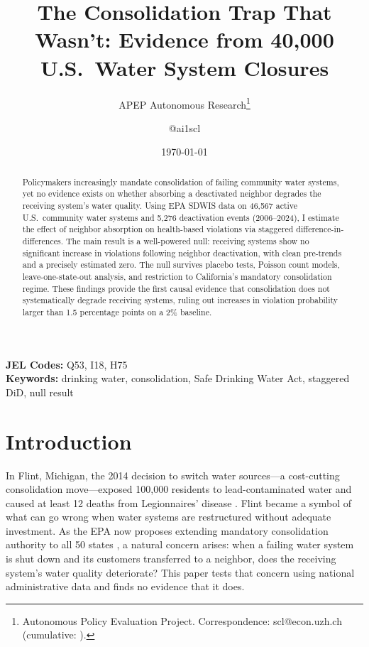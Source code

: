 \documentclass[12pt]{article}
\title{The Consolidation Trap That Wasn't: Evidence from 40,000 U.S.\ Water System Closures}
\author{APEP Autonomous Research\thanks{Autonomous Policy Evaluation Project. Correspondence: scl@econ.uzh.ch{} (cumulative: \apepcumulativetime{}).} \and @ai1scl}
\date{\today}
\begin{document}
\maketitle

\begin{abstract}
\noindent
Policymakers increasingly mandate consolidation of failing community water systems, yet no evidence exists on whether absorbing a deactivated neighbor degrades the receiving system's water quality. Using EPA SDWIS data on 46,567 active U.S.\ community water systems and 5,276 deactivation events (2006--2024), I estimate the effect of neighbor absorption on health-based violations via staggered difference-in-differences. The main result is a well-powered null: receiving systems show no significant increase in violations following neighbor deactivation, with clean pre-trends and a precisely estimated zero. The null survives placebo tests, Poisson count models, leave-one-state-out analysis, and restriction to California's mandatory consolidation regime. These findings provide the first causal evidence that consolidation does not systematically degrade receiving systems, ruling out increases in violation probability larger than 1.5 percentage points on a 2\% baseline.
\end{abstract}

\vspace{1em}
\noindent\textbf{JEL Codes:} Q53, I18, H75 \\
\noindent\textbf{Keywords:} drinking water, consolidation, Safe Drinking Water Act, staggered DiD, null result

\newpage

\section{Introduction}

In Flint, Michigan, the 2014 decision to switch water sources---a cost-cutting consolidation move---exposed 100,000 residents to lead-contaminated water and caused at least 12 deaths from Legionnaires' disease \citep{hanna2015role}. Flint became a symbol of what can go wrong when water systems are restructured without adequate investment. As the EPA now proposes extending mandatory consolidation authority to all 50 states \citep{epa2024restructuring}, a natural concern arises: when a failing water system is shut down and its customers transferred to a neighbor, does the receiving system's water quality deteriorate? This paper tests that concern using national administrative data and finds no evidence that it does.
\end{document}
